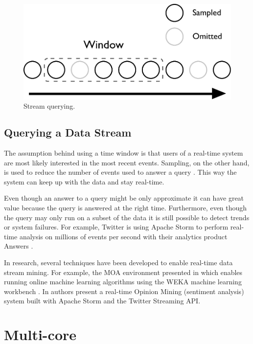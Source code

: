 \documentclass[bsc,deptreport,twoside,singlespacing,normalheadings,parskip]{infthesis}\usepackage[]{graphicx}\usepackage[]{color}
\begin{document}
\begin{figure}[!htb]
	\centering
	\includegraphics[scale=0.5]{pdf/stream.pdf}
	\caption{Stream querying.}
	\label{fig:stream}
\end{figure}

\subsection{Querying a Data Stream}

The assumption behind using a time window is that users of a real-time system are most likely interested in the most recent events. Sampling, on the other hand, is used to reduce the number of events used to answer a query \citep{Gaber:2005:MDS:1083784.1083789}. This way the system can keep up with the data and stay real-time.

Even though an answer to a query might be only approximate it can have great value because the query is answered at the right time. Furthermore, even though the query may only run on a subset of the data it is still possible to detect trends or system failures. For example, Twitter is using Apache Storm to perform real-time analysis on millions of events per second with their analytics product Answers \citep{Solovey}.

In research, several techniques have been developed to enable real-time data stream mining. For example, the MOA environment presented in \cite{Bifet:2010:MMO:1756006.1859903} which enables running online machine learning algorithms using the WEKA machine learning workbench \citep{Holmes1994}. In \cite{rainatwitter} authors present a real-time Opinion Mining (sentiment analysis) system built with Apache Storm and the Twitter Streaming API.

\section{Multi-core}
\label{sec:multicore}
\end{document}
